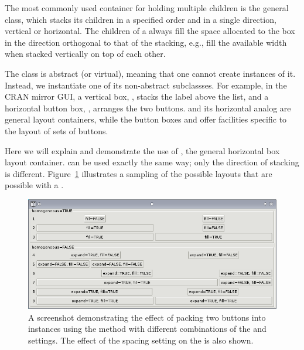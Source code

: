 \documentclass[article,shortnames]{jss}
\begin{document}
The most commonly used container for holding
multiple children is the general  class, which stacks its
children in a specified order and in a single direction, vertical or
horizontal. The children of a  always fill the space
allocated to the box in the direction orthogonal to that of the
stacking, e.g., fill the available width when stacked vertically on top
of each other. 

The  class is abstract (or virtual), meaning
that one cannot create instances of it. Instead, we instantiate one of
its non-abstract subclassses.  For example, in the CRAN mirror GUI, a
vertical box, , stacks the label above the list, and a
horizontal button box, , arranges the two
buttons.  and its horizontal analog  are
general
layout containers, while the button boxes 
and  offer facilities specific to the layout of
sets of buttons.

Here we will explain and demonstrate the use of , the
general horizontal box layout container.  can be used
exactly the same way; only the direction of stacking is different.
Figure~\ref{fig:packing} illustrates a sampling of the possible
layouts that are possible with a .

\begin{figure}[h!tbp]
\begin{center}
\includegraphics{packing.png}
\caption{\label{fig:packing}A screenshot demonstrating the effect of
packing two
buttons into  instances using the 
method 
with different combinations of the  and 
settings. 
The effect of the  spacing setting on the
 is 
also shown.}
\end{center}
\end{figure}
\end{document}

